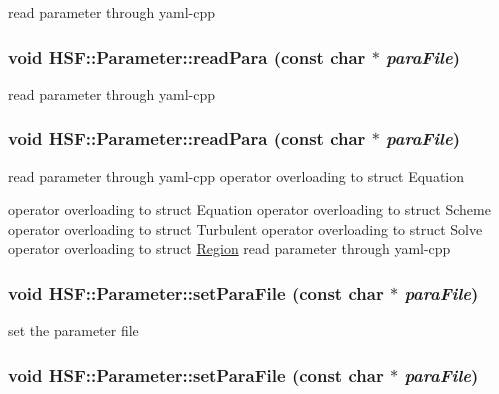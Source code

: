 read parameter through yaml-\/cpp \hypertarget{classHSF_1_1Parameter_a1701a921961849020f7dcd6bf2a8d150}{
\subsubsection[{readPara}]{\setlength{\rightskip}{0pt plus 5cm}void HSF::Parameter::readPara (const char $\ast$ {\em paraFile})}}
\label{classHSF_1_1Parameter_a1701a921961849020f7dcd6bf2a8d150}


read parameter through yaml-\/cpp \hypertarget{classHSF_1_1Parameter_a1701a921961849020f7dcd6bf2a8d150}{
\subsubsection[{readPara}]{\setlength{\rightskip}{0pt plus 5cm}void HSF::Parameter::readPara (const char $\ast$ {\em paraFile})}}
\label{classHSF_1_1Parameter_a1701a921961849020f7dcd6bf2a8d150}


read parameter through yaml-\/cpp operator overloading to struct Equation

operator overloading to struct Equation operator overloading to struct Scheme operator overloading to struct Turbulent operator overloading to struct Solve operator overloading to struct \hyperlink{classHSF_1_1Region}{Region} read parameter through yaml-\/cpp \hypertarget{classHSF_1_1Parameter_a535c67d4b12636e498b98d3e6f0723d1}{
\subsubsection[{setParaFile}]{\setlength{\rightskip}{0pt plus 5cm}void HSF::Parameter::setParaFile (const char $\ast$ {\em paraFile})}}
\label{classHSF_1_1Parameter_a535c67d4b12636e498b98d3e6f0723d1}


set the parameter file \hypertarget{classHSF_1_1Parameter_a535c67d4b12636e498b98d3e6f0723d1}{
\subsubsection[{setParaFile}]{\setlength{\rightskip}{0pt plus 5cm}void HSF::Parameter::setParaFile (const char $\ast$ {\em paraFile})}}
\label{classHSF_1_1Parameter_a535c67d4b12636e498b98d3e6f0723d1}


